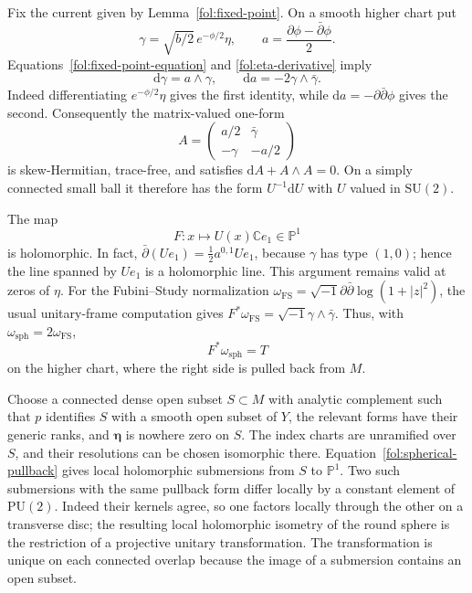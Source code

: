 \documentclass[11pt,letterpaper]{article}
\theoremstyle{definition}
\theoremstyle{remark}
\begin{document}
Fix the current given by Lemma~\ref{fol:fixed-point}.  On a smooth higher
chart put
\begin{equation}\label{fol:unitary-forms}
 \gamma=\sqrt{b/2}\,e^{-\phi/2}\eta,\qquad
 a=\frac{\partial\phi-\bar\partial\phi}{2}.
\end{equation}
Equations~\eqref{fol:fixed-point-equation} and
\eqref{fol:eta-derivative} imply
\begin{equation}\label{fol:structure-equations}
 \mathrm{d}\gamma=a\wedge\gamma,\qquad
 \mathrm{d} a=-2\gamma\wedge\bar\gamma.
\end{equation}
Indeed differentiating $e^{-\phi/2}\eta$ gives the first identity, while
$\mathrm{d} a=-\partial\bar\partial\phi$ gives the second.  Consequently the
matrix-valued one-form
\begin{equation}\label{fol:flat-matrix}
 A=
 \begin{pmatrix}
  a/2 & \bar\gamma\\
  -\gamma & -a/2
 \end{pmatrix}
\end{equation}
is skew-Hermitian, trace-free, and satisfies
$\mathrm{d} A+A\wedge A=0$.  On a simply connected small ball it therefore
has the form $U^{-1}\mathrm{d} U$ with $U$ valued in $\mathrm{SU}(2)$.

The map
\[
 F\colon x\longmapsto U(x)\mathbb{C} e_1\in\mathbb{P}^1
\]
is holomorphic.  In fact,
$\bar\partial(Ue_1)=\tfrac12a^{0,1}Ue_1$, because $\gamma$ has type
$(1,0)$; hence the line spanned by $Ue_1$ is a holomorphic line.
This argument remains valid at zeros of $\eta$.
For the Fubini--Study normalization
$\omega_{\mathrm{FS}}=\sqrt{-1}\partial\bar\partial\log(1+|z|^2)$,
the usual unitary-frame computation gives
$F^*\omega_{\mathrm{FS}}=\sqrt{-1}\gamma\wedge\bar\gamma$.
Thus, with $\omega_{\mathrm{sph}}=2\omega_{\mathrm{FS}}$,
\begin{equation}\label{fol:spherical-pullback}
 F^*\omega_{\mathrm{sph}}=T
\end{equation}
on the higher chart, where the right side is pulled back from $M$.

Choose a connected dense open subset $S\subset M$ with analytic
complement such that $p$ identifies $S$ with a smooth open subset of
$Y$, the relevant forms have their generic ranks, and
$\boldsymbol\eta$ is nowhere zero on $S$.  The index charts are
unramified over $S$, and their resolutions can be chosen isomorphic
there.  Equation~\eqref{fol:spherical-pullback} gives local holomorphic
submersions from $S$ to $\mathbb{P}^1$.  Two such submersions with the same
pullback form differ locally by a constant element of
$\mathrm{PU}(2)$.  Indeed their kernels agree, so one factors locally
through the other on a transverse disc; the resulting local holomorphic
isometry of the round sphere is the restriction of a projective unitary
transformation.  The transformation is unique on each connected
overlap because the image of a submersion contains an open subset.
\end{document}
